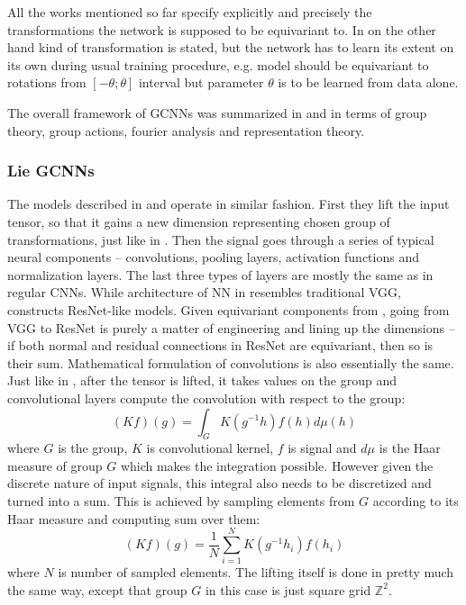     All the works mentioned so far specify explicitly and precisely the
    transformations the network is supposed to be equivariant to. In
    \cite{augerino} on the other hand kind of transformation is stated, but the
    network has to learn its extent on its own during usual training
    procedure, e.g. model should be equivariant to rotations from
    $\left[-\theta;\theta\right]$ interval but parameter $\theta$ is to be learned from
    data alone.


    The overall framework of GCNNs was summarized in \cite{kondor_trivedi} and
    \cite{cohen2020general} in terms of group
    theory, group actions, fourier analysis and representation theory.

    \subsubsection{Lie GCNNs}
    \label{sec:lie_gcnn}
    The models described in \cite{lieconv} and \cite{bekkers2019} operate in
    similar fashion.
    First they lift the input tensor, so that it gains a new dimension
    representing chosen group of transformations, just like in \cite{cohen2016}.
    Then the signal goes through a series of typical neural components -- convolutions,
    pooling layers, activation functions and normalization layers. The last
    three types of layers are mostly the same as in regular CNNs. While
    architecture of NN in \cite{bekkers2019} resembles traditional VGG,
    \cite{lieconv} constructs ResNet-like models. Given equivariant
    components from \cite{bekkers2019}, going from VGG to ResNet is purely a
    matter of engineering and lining up the dimensions -- if both normal and
    residual connections in ResNet are equivariant, then so is their sum.
    Mathematical formulation of convolutions is also essentially the same.
    Just like in \cite{cohen2016}, after the tensor is lifted, it takes values
    on the group and convolutional layers compute the convolution with respect
    to the group:
    \begin{equation}
        (Kf)(g) = \int_G K(g^{-1}h)f(h)d\mu(h)
        \label{eq:lie_integral}
    \end{equation}
    where $G$ is the group, $K$ is convolutional kernel, $f$ is signal and $d\mu$ is the Haar
    measure of group $G$ which makes the integration possible. However given
    the discrete nature of input signals, this integral also needs to be
    discretized and turned into a sum. This is achieved by sampling elements from $G$
    according to its Haar measure and computing sum over them:
    \begin{equation}
        (Kf)(g) = \frac{1}{N} \sum_{i=1}^N K(g^{-1}h_i)f(h_i)
        \label{eq:lie_sum}
    \end{equation}
    where $N$ is number of sampled elements. The lifting itself is done in
    pretty much the same way, except that group $G$ in this case is just square
    grid $\mathbb{Z}^2$.

